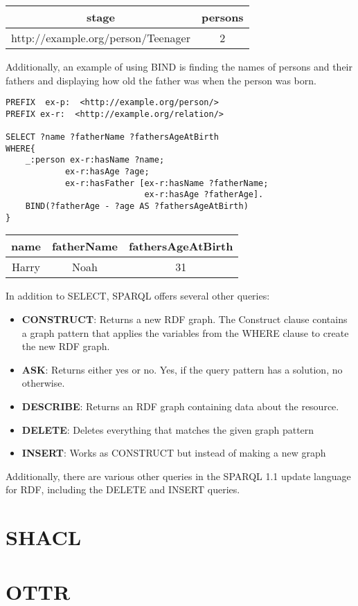\para
\begin{tabular}{@{}cc@{}}
    \toprule
    stage & persons  \\ \midrule
    http://example.org/person/Teenager & 2 \\ \bottomrule
\end{tabular}

\para
Additionally, an example of using BIND is finding the names of persons and their fathers and displaying how old the father was when the person was born.
\begin{lstlisting}[frame=single, language=turtle, frame=none]
PREFIX  ex-p:  <http://example.org/person/> 
PREFIX ex-r:  <http://example.org/relation/> 

SELECT ?name ?fatherName ?fathersAgeAtBirth
WHERE{
    _:person ex-r:hasName ?name;
            ex-r:hasAge ?age;
            ex-r:hasFather [ex-r:hasName ?fatherName;
                            ex-r:hasAge ?fatherAge].
    BIND(?fatherAge - ?age AS ?fathersAgeAtBirth)
}
\end{lstlisting}
    
\para
\begin{tabular}{@{}ccc@{}}
    \toprule
    name & fatherName & fathersAgeAtBirth \\ \midrule
    Harry & Noah & 31\\\bottomrule
\end{tabular}



\para
In addition to SELECT, SPARQL offers several other queries:
\begin{itemize}
    \item \textbf{CONSTRUCT}: Returns a new RDF graph. The Construct clause contains a graph pattern that applies the variables from the WHERE clause to create the new RDF graph. 
    \item \textbf{ASK}: Returns either yes or no. Yes, if the query pattern has a solution, no otherwise. 
    \item \textbf{DESCRIBE}: Returns an RDF graph containing data about the resource. 
    \item \textbf{DELETE}: Deletes everything that matches the given graph pattern 
    \item \textbf{INSERT}: Works as CONSTRUCT but instead of making a new graph
\end{itemize}
Additionally, there are various other queries in the SPARQL 1.1 update language for RDF\cite{SPARQL1.1Update}, including the DELETE and INSERT queries. 


 

\section{SHACL}

\section{OTTR}
\label{OTTR}